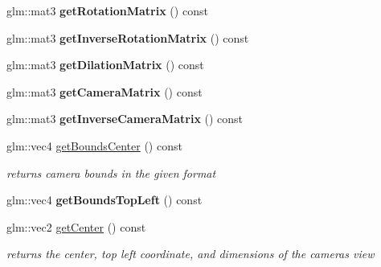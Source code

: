 \begin{DoxyCompactItemize}
\mbox{\label{classnta_1_1Camera2D_ab3fb29b12f0b118dd2be95f701b81e2f}} 
glm\+::mat3 {\bfseries get\+Rotation\+Matrix} () const
\item 
\mbox{\label{classnta_1_1Camera2D_a5b28e343c69aa1f7ded1b8416e556e21}} 
glm\+::mat3 {\bfseries get\+Inverse\+Rotation\+Matrix} () const
\item 
\mbox{\label{classnta_1_1Camera2D_a685dbe2ddad68666132fbf1edec932a6}} 
glm\+::mat3 {\bfseries get\+Dilation\+Matrix} () const
\item 
\mbox{\label{classnta_1_1Camera2D_a203daa81f32279e969de57a549165297}} 
glm\+::mat3 {\bfseries get\+Camera\+Matrix} () const
\item 
\mbox{\label{classnta_1_1Camera2D_a28bb108270be9a73ff39c2573956ab9c}} 
glm\+::mat3 {\bfseries get\+Inverse\+Camera\+Matrix} () const
\item 
\mbox{\label{classnta_1_1Camera2D_ad02d4b9a995f3919c753fd2ea6d9f8f1}} 
glm\+::vec4 \hyperlink{classnta_1_1Camera2D_ad02d4b9a995f3919c753fd2ea6d9f8f1}{get\+Bounds\+Center} () const
\begin{DoxyCompactList}\small\item\em returns camera bounds in the given format \end{DoxyCompactList}\item 
\mbox{\label{classnta_1_1Camera2D_af3b971aa62c8e6ca7287d0d236bb3e3d}} 
glm\+::vec4 {\bfseries get\+Bounds\+Top\+Left} () const
\item 
\mbox{\label{classnta_1_1Camera2D_add5061ade3ed4eb82d3e75f6aba97f70}} 
glm\+::vec2 \hyperlink{classnta_1_1Camera2D_add5061ade3ed4eb82d3e75f6aba97f70}{get\+Center} () const
\begin{DoxyCompactList}\small\item\em returns the center, top left coordinate, and dimensions of the camera\textquotesingle{}s view \end{DoxyCompactList}\item 
\mbox{\label{classnta_1_1Camera2D_adbfd52308be6b9c56736400ac67b65c5}} 

\end{DoxyCompactItemize}
